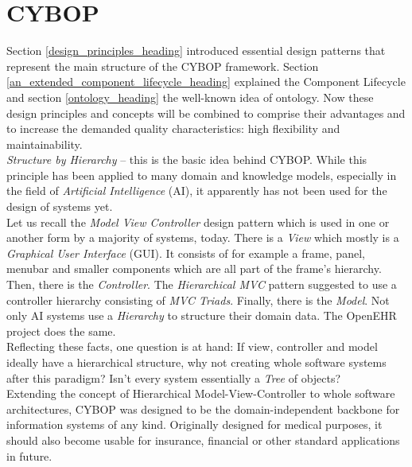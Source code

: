 %
%
%
%
%
%
%

\section{CYBOP}
\label{cybop_heading}

Section \ref{design_principles_heading} introduced essential design patterns
that represent the main structure of the CYBOP framework. Section
\ref{an_extended_component_lifecycle_heading} explained the Component Lifecycle
and section \ref{ontology_heading} the well-known idea of ontology. Now these
design principles and concepts will be combined to comprise their advantages and
to increase the demanded quality characteristics: high flexibility and
maintainability.\\
\emph{Structure by Hierarchy} -- this is the basic idea behind CYBOP. While this
principle has been applied to many domain and knowledge models, especially in the
field of \emph{Artificial Intelligence} (AI), it apparently has not been used
for the design of systems yet.\\
Let us recall the \emph{Model View Controller} design pattern which is used in
one or another form by a majority of systems, today. There is a \emph{View} which
mostly is a \emph{Graphical User Interface} (GUI). It consists of for example a
frame, panel, menubar and smaller components which are all part of the frame's
hierarchy. Then, there is the \emph{Controller}. The \emph{Hierarchical MVC}
pattern suggested to use a controller hierarchy consisting of \emph{MVC Triads}.
Finally, there is the \emph{Model}. Not only AI systems use a \emph{Hierarchy}
to structure their domain data. The OpenEHR project \cite{openehr} does the same.\\
Reflecting these facts, one question is at hand: If view, controller and model
ideally have a hierarchical structure, why not creating whole software systems
after this paradigm? Isn't every system essentially a \emph{Tree} of objects?\\
Extending the concept of Hierarchical Model-View-Controller to whole software
architectures, CYBOP was designed to be the domain-independent backbone for
information systems of any kind. Originally designed for medical purposes, it
should also become usable for insurance, financial or other standard applications
in future.

